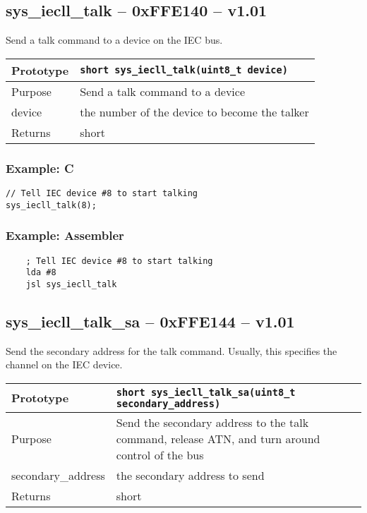 \subsection*{sys\_iecll\_talk -- 0xFFE140 -- v1.01}
Send a {\sc talk} command to a device on the IEC bus.

\bigskip

\begin{table}[!h]\begin{tabular}{|l||l|} \hline
Prototype & \lstinline!short sys_iecll_talk(uint8_t device)! \\ \hline
Purpose & Send a {\sc talk} command to a device \\ \hline
device & the number of the device to become the talker \\ \hline
Returns & short \\ \hline
\end{tabular}\end{table}

\subsubsection*{Example: C}
\begin{lstlisting}
// Tell IEC device #8 to start talking
sys_iecll_talk(8);
\end{lstlisting}

\subsubsection*{Example: Assembler}
\begin{verbatim}
    ; Tell IEC device #8 to start talking
    lda #8
    jsl sys_iecll_talk
\end{verbatim}


\subsection*{sys\_iecll\_talk\_sa -- 0xFFE144 -- v1.01}
Send the secondary address for the {\sc talk} command.
Usually, this specifies the channel on the IEC device.

\bigskip

\begin{table}[!h]\begin{tabular}{|l||l|} \hline
Prototype & \lstinline!short sys_iecll_talk_sa(uint8_t secondary_address)! \\ \hline
Purpose & Send the secondary address to the {\sc talk} command, release ATN,
and turn around control of the bus \\ \hline
secondary\_address & the secondary address to send \\ \hline
Returns & short \\ \hline
\end{tabular}\end{table}

